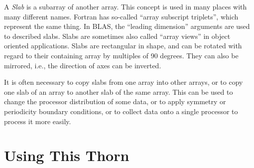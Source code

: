A \emph{Slab} is a subarray of another array.  This concept is used in
many places with many different names.  Fortran has so-called ``array
subscript triplets'', which represent the same thing.  In BLAS, the
``leading dimension'' arguments are used to described slabs.  Slabs
are sometimes also called ``array views'' in object oriented
applications.  Slabs are rectangular in shape, and can be rotated with
regard to their containing array by multiples of 90 degrees.  They can
also be mirrored, i.e., the direction of axes can be inverted.

It is often necessary to copy slabs from one array into other arrays,
or to copy one slab of an array to another slab of the same array.
This can be used to change the processor distribution of some data, or
to apply symmetry or periodicity boundary conditions, or to collect
data onto a single processor to process it more easily.



\section{Using This Thorn}

